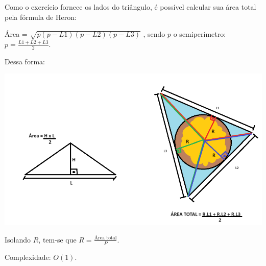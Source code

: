 Como o exercício fornece os lados do triângulo, é possível calcular sua área
total pela fórmula de Heron:

Área = $\sqrt{p(p-L1)(p-L2)(p-L3)}$ , sendo $p$ o semiperímetro:
$p = \displaystyle\frac{L1+L2+L3}{2}$.

Dessa forma:

\begin{center}
    \includegraphics[scale=0.4]{vasilhaerrada/editorial.png}
\end{center}

Isolando $R$, tem-se que $R=\displaystyle\frac{\text{Área total}}{P}$.

Complexidade: $O(1)$.
